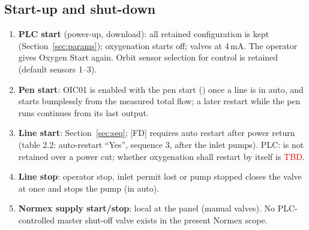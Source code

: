 \documentclass[11pt,a4paper]{article}
\newcommand{\TBD}{\textcolor{red}{TBD}}
\begin{document}
\subsection{Start-up and shut-down}
\begin{enumerate}[label=S\arabic*, nosep]
  \item \textbf{PLC start} (power-up, download): all retained configuration is kept
        (Section~\ref{sec:params}); oxygenation starts off; valves at 4\,mA. The operator gives Oxygen
        Start again. Orbit sensor selection for control is retained (default sensors 1--3).
  \item \textbf{Pen start}: OIC01 is enabled with the pen start () once a line
        is in auto, and starts bumplessly from the measured total flow; a later restart while the pen
        runs continues from its last output.
  \item \textbf{Line start}: Section~\ref{sec:seq}; [FD] requires auto restart after power return
        (table 2.2: auto-restart ``Yes'', sequence 3, after the inlet pumps). PLC: 
        is not retained over a power cut; whether oxygenation shall restart by itself is \TBD{}.
  \item \textbf{Line stop}: operator stop, inlet permit lost or pump stopped closes the valve at once
        and stops the pump (in auto).
  \item \textbf{Normex supply start/stop}: local at the panel (manual valves). No PLC-controlled master
        shut-off valve exists in the present Normex scope.
\end{enumerate}
\end{document}
